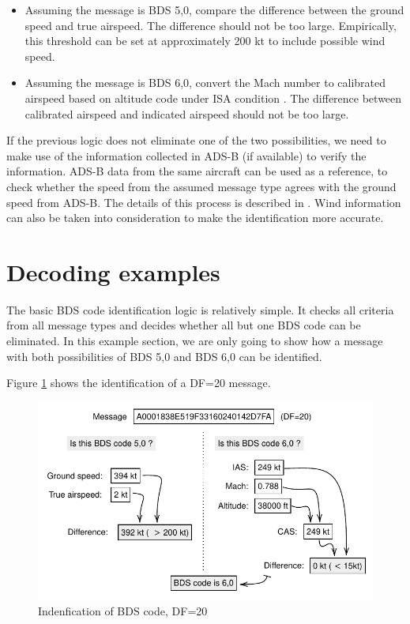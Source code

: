 \begin{itemize}
    \item Assuming the message is BDS 5,0, compare the difference between the ground speed and true airspeed. The difference should not be too large. Empirically, this threshold can be set at approximately 200 kt to include possible wind speed. 
    \item Assuming the message is BDS 6,0, convert the Mach number to calibrated airspeed based on altitude code under ISA condition \cite{young2017}. The difference between calibrated airspeed and indicated airspeed should not be too large.
\end{itemize}

If the previous logic does not eliminate one of the two possibilities, we need to make use of the information collected in ADS-B (if available) to verify the information. ADS-B data from the same aircraft can be used as a reference, to check whether the speed from the assumed message type agrees with the ground speed from ADS-B. The details of this process is described in \cite{sun2019pymodes}. Wind information can also be taken into consideration to make the identification more accurate.


\section{Decoding examples}

The basic BDS code identification logic is relatively simple. It checks all criteria from all message types and decides whether all but one BDS code can be eliminated. In this example section, we are only going to show how a message with both possibilities of BDS 5,0 and BDS 6,0 can be identified.


Figure \ref{fig:bds_bds_infer_example_1} shows the identification of a DF=20 message. 

\begin{figure}[ht]
\centering
  \includegraphics[scale=0.85]{figures/mode_s/bds_infer_example_1.pdf}
\caption{Indenfication of BDS code, DF=20}
\label{fig:bds_bds_infer_example_1}
\end{figure}

